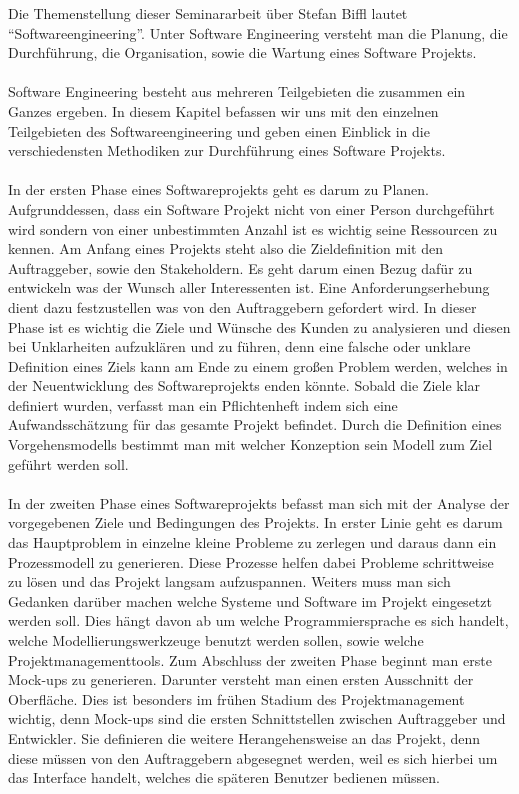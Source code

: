 \documentclass{llncs}
\begin{document}
Die Themenstellung dieser Seminararbeit über Stefan Biffl lautet “Softwareengineering”. Unter Software Engineering versteht man die Planung, die Durchführung, die Organisation, sowie die Wartung eines Software Projekts. 
\\ \\
Software Engineering besteht aus mehreren Teilgebieten die zusammen ein Ganzes ergeben. In diesem Kapitel befassen wir uns mit den einzelnen Teilgebieten des Softwareengineering und geben einen Einblick in die verschiedensten Methodiken zur Durchführung eines Software Projekts.
\\ \\
In der ersten Phase eines Softwareprojekts geht es darum zu Planen. Aufgrunddessen, dass ein Software Projekt nicht von einer Person durchgeführt wird sondern von einer unbestimmten Anzahl ist es wichtig seine Ressourcen zu kennen. Am Anfang eines Projekts steht also die Zieldefinition mit den Auftraggeber, sowie den Stakeholdern. Es geht darum einen Bezug dafür zu entwickeln was der Wunsch aller Interessenten ist. Eine Anforderungserhebung dient dazu festzustellen was von den Auftraggebern gefordert wird. In dieser Phase ist es wichtig die Ziele und Wünsche des Kunden zu analysieren und diesen bei Unklarheiten aufzuklären und zu führen, denn eine falsche oder unklare Definition eines Ziels kann am Ende zu einem großen Problem werden, welches in der Neuentwicklung des Softwareprojekts enden könnte. Sobald die Ziele klar definiert wurden, verfasst man ein Pflichtenheft indem sich eine Aufwandsschätzung für das gesamte Projekt befindet. Durch die Definition eines Vorgehensmodells bestimmt man mit welcher Konzeption sein Modell zum Ziel geführt werden soll.
\\ \\
In der zweiten Phase eines Softwareprojekts befasst man sich mit der Analyse der vorgegebenen Ziele und Bedingungen des Projekts. In erster Linie geht es darum das Hauptproblem in einzelne kleine Probleme zu zerlegen und daraus dann ein Prozessmodell zu generieren. Diese Prozesse helfen dabei Probleme schrittweise zu lösen und das Projekt langsam aufzuspannen. Weiters muss man sich Gedanken darüber machen welche Systeme und Software im Projekt eingesetzt werden soll. Dies hängt davon ab um welche Programmiersprache es sich handelt, welche Modellierungswerkzeuge benutzt werden sollen, sowie welche Projektmanagementtools. Zum Abschluss der zweiten Phase beginnt man erste Mock-ups zu generieren. Darunter versteht man einen ersten Ausschnitt der Oberfläche. Dies ist besonders im frühen Stadium des Projektmanagement wichtig, denn Mock-ups sind die ersten Schnittstellen zwischen Auftraggeber und Entwickler. Sie definieren die weitere Herangehensweise an das Projekt, denn diese müssen von den Auftraggebern abgesegnet werden, weil es sich hierbei um das Interface handelt, welches die späteren Benutzer bedienen müssen.
\end{document}
